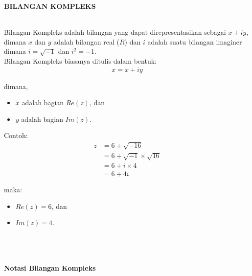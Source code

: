 \documentclass{article}
\begin{document}
    \begin{center}
        \textbf{BILANGAN KOMPLEKS}
    \end{center}
    \leavevmode\\

    Bilangan Kompleks adalah bilangan yang dapat direpresentasikan sebagai \( x + iy \), dimana $x$ dan $y$ adalah bilangan real ($R$) dan $i$ adalah suatu bilangan imaginer dimana \( i = \sqrt{-1} \) dan \( i^2 = -1 \).\\

    Bilangan Kompleks biasanya ditulis dalam bentuk:
    \begin{align}
        x = x + iy
    \end{align}

    \>dimana,
    \begin{itemize}
        \item $x$ adalah bagian $Re(z)$, dan
        \item $y$ adalah bagian $Im(z)$. \\
    \end{itemize}
    
    Contoh:
    \begin{align}
        z & = 6 + \sqrt{-16} 
        \nonumber\\
        & = 6 + \sqrt{-1} \times \sqrt{16}
        \nonumber\\
        & = 6 + i \times 4
        \nonumber\\
        & = 6 + 4i
    \end{align}

    maka:
    \begin{itemize}
        \item $Re(z) = 6$, dan
        \item $Im(z) = 4$. \\ \\ \\ \\
    \end{itemize}

    \newpage
    \begin{center}
        \textbf{Notasi Bilangan Kompleks}
    \end{center}
    \leavevmode\\
    
    \\ \\
\end{document}
